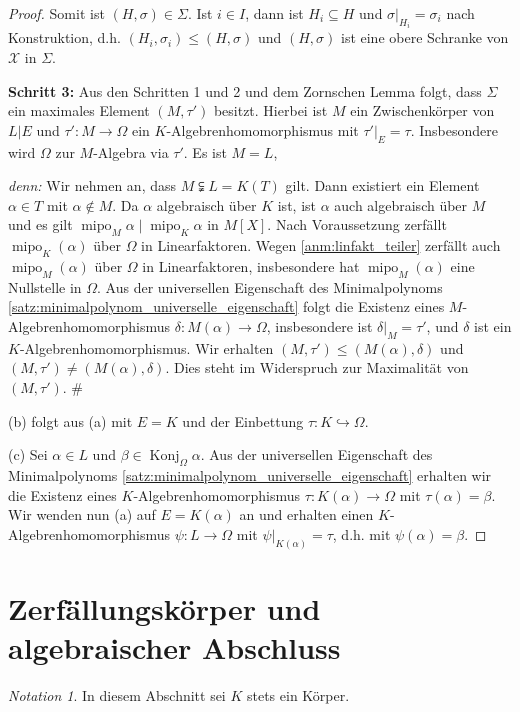 \documentclass[a4paper, twoside, 11pt, ngerman]{report}
\newcommand{\calX}{\mathcal X}
\DeclareMathOperator{\Konj}{Konj}
\DeclareMathOperator{\mipo}{mipo}
\theoremstyle{definistyle}
\theoremstyle{remark}
\newtheorem*{notation}{Notation}
\newenvironment{denn}%
  {\par\textit{denn:}}%
  {\hfill\#\par}
\begin{document}
\begin{proof}
Somit ist $(H, \sigma) \in \Sigma$. Ist $i\in I$, dann ist $H_i \subseteq H$ und $\sigma|_{H_i} = \sigma_i$ nach Konstruktion, d.h. $(H_i, \sigma_i) \leq (H, \sigma)$ und $(H, \sigma)$ ist eine obere Schranke von $\calX$ in $\Sigma$.

\textbf{Schritt 3:} Aus den Schritten 1 und 2 und dem Zornschen Lemma folgt, dass 
$\Sigma$ ein maximales Element $(M, \tau')$ besitzt. Hierbei ist $M$ ein Zwischenkörper von $L|E$ und $\tau' \colon M \to \Omega$ ein $K$-Algebrenhomomorphismus mit $\tau'|_E = \tau$. Insbesondere wird $\Omega$ zur $M$-Algebra via $\tau'$. Es ist $M = L$,
\begin{denn}
Wir nehmen an, dass $M\subsetneqq L=K(T)$ gilt. Dann existiert ein Element $\alpha\in T$ mit $\alpha\not\in M$.
Da $\alpha$ algebraisch über $K$ ist, ist $\alpha$ auch algebraisch über $M$ und es gilt $\mipo_M\alpha\mid\mipo_K\alpha$
in $M[X]$. Nach Voraussetzung zerfällt $\mipo_K(\alpha)$ über $\Omega$ in Linearfaktoren. 
Wegen \ref{anm:linfakt_teiler} zerfällt auch $\mipo_M(\alpha)$ über $\Omega$ in Linearfaktoren,
insbesondere hat $\mipo_M(\alpha)$ eine Nullstelle in $\Omega$. Aus der universellen Eigenschaft des Minimalpolynoms \ref{satz:minimalpolynom_universelle_eigenschaft} folgt die Existenz eines 
$M$-Algebrenhomomorphismus $\delta \colon M(\alpha) \to \Omega$, insbesondere ist $\delta|_{M}=\tau'$, und $\delta$
ist ein $K$-Algebrenhomomorphismus. Wir erhalten $(M,\tau')\leq(M(\alpha),\delta)$ und $(M,\tau')\neq(M(\alpha),\delta)$.
Dies steht im Widerspruch zur Maximalität von $(M,\tau')$.
\end{denn}
(b) folgt aus (a) mit $E = K$ und der Einbettung $\tau\colon K\hookrightarrow\Omega$.

(c) Sei $\alpha\in L$ und $\beta\in\Konj_\Omega\alpha$.
Aus der universellen Eigenschaft des Minimalpolynoms \ref{satz:minimalpolynom_universelle_eigenschaft} erhalten wir die Existenz eines $K$-Algebrenhomomorphismus $\tau\colon K(\alpha)\to\Omega$ mit $\tau(\alpha)=\beta$.
Wir wenden nun (a) auf $E=K(\alpha)$ an und erhalten einen $K$-Algebrenhomomorphismus $\psi \colon L \to \Omega$ mit $\psi|_{K(\alpha)} = \tau$, d.h. mit $\psi(\alpha) = \beta$.
\end{proof}

\section{Zerfällungskörper und algebraischer Abschluss}

\begin{notation}
In diesem Abschnitt sei $K$ stets ein Körper.  
\end{notation}
\end{document}

